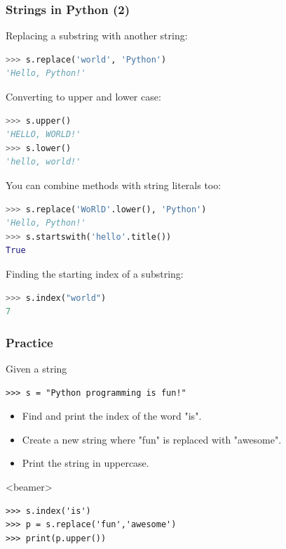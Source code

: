 \begin{frame}[fragile]
  \frametitle{Strings in Python (2)}
  Replacing a substring with another string:
  \begin{lstlisting}[language=Python,numbers=none]
>>> s.replace('world', 'Python')
'Hello, Python!'
  \end{lstlisting}
  Converting to upper and lower case:
  \begin{lstlisting}[language=Python,numbers=none]
>>> s.upper()
'HELLO, WORLD!'
>>> s.lower()
'hello, world!'
  \end{lstlisting}
  You can combine methods with string literals too:
  \begin{lstlisting}[language=Python,numbers=none]
>>> s.replace('WoRlD'.lower(), 'Python')
'Hello, Python!'
>>> s.startswith('hello'.title())
True
  \end{lstlisting}
  Finding the starting index of a substring:
  \begin{lstlisting}[language=Python,numbers=none]
>>> s.index("world")
7
  \end{lstlisting}
\end{frame}

\begin{frame}[fragile,label=practice_strings]
  \frametitle{Practice}
  Given a string
  \begin{lstlisting}
>>> s = "Python programming is fun!"
  \end{lstlisting}
  \begin{itemize}
   \item Find and print the index of the word "is".
   \item Create a new string where "fun" is replaced with "awesome".
   \item Print the string in uppercase.
  \end{itemize}
  \begin{onlyenv}<beamer>
    \begin{lstlisting}[]
>>> s.index('is')
>>> p = s.replace('fun','awesome')
>>> print(p.upper())
    \end{lstlisting}
  \end{onlyenv}
 \end{frame}

